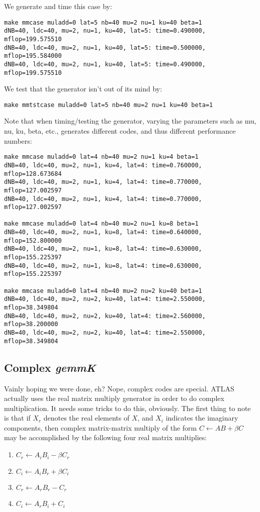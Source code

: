 \documentclass[11pt]{article}
\begin{document}
We generate and time this case by:
\begin{verbatim}
make mmcase muladd=0 lat=5 nb=40 mu=2 nu=1 ku=40 beta=1
dNB=40, ldc=40, mu=2, nu=1, ku=40, lat=5: time=0.490000, mflop=199.575510
dNB=40, ldc=40, mu=2, nu=1, ku=40, lat=5: time=0.500000, mflop=195.584000
dNB=40, ldc=40, mu=2, nu=1, ku=40, lat=5: time=0.490000, mflop=199.575510
\end{verbatim}

We test that the generator isn't out of its mind by:
\begin{verbatim}
make mmtstcase muladd=0 lat=5 nb=40 mu=2 nu=1 ku=40 beta=1
\end{verbatim}

Note that when timing/testing the generator, varying the parameters such
as mu, nu, ku, beta, etc., generates different codes, and thus different
performance numbers:
\begin{verbatim}
make mmcase muladd=0 lat=4 nb=40 mu=2 nu=1 ku=4 beta=1
dNB=40, ldc=40, mu=2, nu=1, ku=4, lat=4: time=0.760000, mflop=128.673684
dNB=40, ldc=40, mu=2, nu=1, ku=4, lat=4: time=0.770000, mflop=127.002597
dNB=40, ldc=40, mu=2, nu=1, ku=4, lat=4: time=0.770000, mflop=127.002597

make mmcase muladd=0 lat=4 nb=40 mu=2 nu=1 ku=8 beta=1
dNB=40, ldc=40, mu=2, nu=1, ku=8, lat=4: time=0.640000, mflop=152.800000
dNB=40, ldc=40, mu=2, nu=1, ku=8, lat=4: time=0.630000, mflop=155.225397
dNB=40, ldc=40, mu=2, nu=1, ku=8, lat=4: time=0.630000, mflop=155.225397

make mmcase muladd=0 lat=4 nb=40 mu=2 nu=2 ku=40 beta=1
dNB=40, ldc=40, mu=2, nu=2, ku=40, lat=4: time=2.550000, mflop=38.349804
dNB=40, ldc=40, mu=2, nu=2, ku=40, lat=4: time=2.560000, mflop=38.200000
dNB=40, ldc=40, mu=2, nu=2, ku=40, lat=4: time=2.550000, mflop=38.349804
\end{verbatim}

\subsection{Complex {\it gemmK}}
Vainly hoping we were done, eh?  Nope, complex codes are special.  
ATLAS actually uses the real matrix multiply generator in order to
do complex multiplication.  It needs some tricks to do this, obviously.
The first thing to note is that if $X_r$ denotes the real elements of $X$,
and $X_i$ indicates the imaginary components, then complex matrix-matrix
multiply of the form $C \leftarrow A B + \beta C$ may be accomplished by 
the following four real matrix multiplies:
{\samepage
\begin{enumerate}
\item $C_r \leftarrow A_i B_i - \beta C_r$
\item $C_i \leftarrow A_i B_r + \beta C_i$
\item $C_r \leftarrow A_r B_r - C_r$
\item $C_i \leftarrow A_r B_i + C_i$
\end{enumerate}
}
\end{document}
